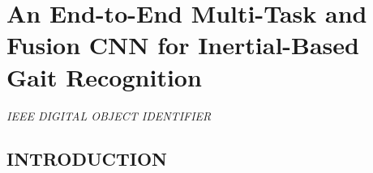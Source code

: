 \section{An End-to-End Multi-Task and Fusion CNN for Inertial-Based Gait Recognition}

\begin{flushleft}
    \author{
    Rubén Delgrado-Esca$ \tilde{n} $o,
    Francisco M. Castro,
    Julián Ramos Cózar,
    Manuel J. Marín-Jiménez,
    and Nicolás Guil
    }
\end{flushleft}

\begin{center}
    \emph{IEEE DIGITAL OBJECT IDENTIFIER}
\end{center}

\subsection{INTRODUCTION}